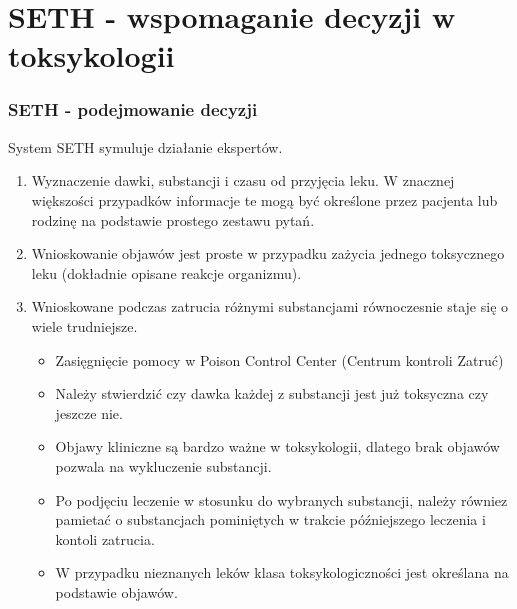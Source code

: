 \section{SETH - wspomaganie decyzji w toksykologii}


\begin{frame}[allowframebreaks]
\frametitle{SETH - podejmowanie decyzji}

System SETH symuluje działanie ekspertów.

\begin{enumerate}
    \item Wyznaczenie dawki, substancji i czasu od przyjęcia leku. W znacznej 
    większości przypadków informacje te mogą być określone przez pacjenta 
    lub rodzinę na podstawie prostego zestawu pytań.
    \item Wnioskowanie objawów jest proste w przypadku zażycia jednego
    toksycznego leku (dokładnie opisane reakcje organizmu).
\framebreak
    \item Wnioskowane podczas zatrucia różnymi substancjami równoczesnie staje
    się o wiele trudniejsze.
    \begin{itemize}
        \item Zasięgnięcie pomocy w Poison Control Center (Centrum kontroli
        Zatruć)
        \item Należy stwierdzić czy dawka każdej z substancji jest już
        toksyczna czy jeszcze nie.
        \item Objawy kliniczne są bardzo ważne w toksykologii, dlatego brak
        objawów pozwala na wykluczenie substancji.
        \item Po podjęciu leczenie w stosunku do wybranych substancji, należy
        równiez pamietać o substancjach pominiętych w trakcie późniejszego
        leczenia i kontoli zatrucia.
        \item W przypadku nieznanych leków klasa toksykologiczności jest
        określana na podstawie objawów.
    \end{itemize}

\end{enumerate}

\end{frame}

